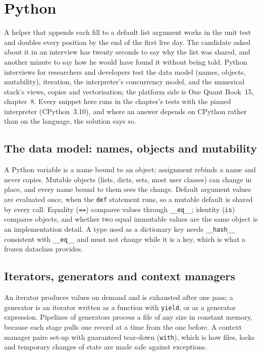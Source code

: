 \chapter{Python}\label{ch:iv:python}

A helper that appends each fill to a default list argument works in the unit test and doubles every position by the end of
the first live day. The candidate asked about it in an interview has twenty seconds to say why the list was shared, and another
minute to say how he would have found it without being told. Python interviews for researchers and developers test the data
model (names, objects, mutability), iteration, the interpreter's concurrency model, and the numerical stack's views, copies and
vectorisation; the platform side is One Quant Book~15, chapter~8. Every snippet here runs in the chapter's tests with the pinned
interpreter (CPython~3.10), and where an answer depends on CPython rather than on the language, the solution says so.

\section{The data model: names, objects and mutability}

A Python variable is a name bound to an object; assignment rebinds a name and never copies. Mutable objects (lists, dicts,
sets, most user classes) can change in place, and every name bound to them sees the change. Default argument values are
evaluated once, when the \texttt{def} statement runs, so a mutable default is shared by every call. Equality (\texttt{==}) compares
values through \texttt{\_\_eq\_\_}; identity (\texttt{is}) compares objects, and whether two equal immutable values are the same
object is an implementation detail. A type used as a dictionary key needs \texttt{\_\_hash\_\_} consistent with \texttt{\_\_eq\_\_} and
must not change while it is a key, which is what a frozen dataclass provides.

\label{lst:iv:python:default}

\section{Iterators, generators and context managers}

An iterator produces values on demand and is exhausted after one pass; a generator is an iterator written as a function with
\texttt{yield}, or as a generator expression. Pipelines of generators process a file of any size in constant memory, because
each stage pulls one record at a time from the one before. A context manager pairs set-up with guaranteed tear-down
(\texttt{with}), which is how files, locks and temporary changes of state are made safe against exceptions.

